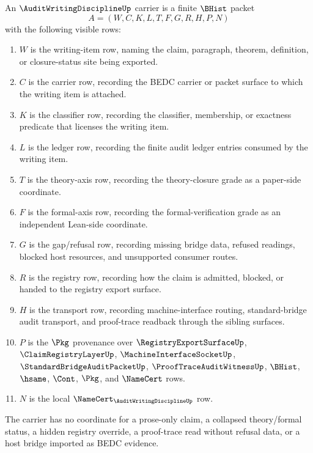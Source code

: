 \begin{definition}
\label{def:audit-writing-discipline-carrier}
An $\AuditWritingDisciplineUp$ carrier is a finite $\BHist$ packet
$$
A=(W,C,K,L,T,F,G,R,H,P,N)
$$
with the following visible rows:
\begin{enumerate}
\item $W$ is the writing-item row, naming the claim, paragraph, theorem, definition, or closure-status site being exported.
\item $C$ is the carrier row, recording the BEDC carrier or packet surface to which the writing item is attached.
\item $K$ is the classifier row, recording the classifier, membership, or exactness predicate that licenses the writing item.
\item $L$ is the ledger row, recording the finite audit ledger entries consumed by the writing item.
\item $T$ is the theory-axis row, recording the theory-closure grade as a paper-side coordinate.
\item $F$ is the formal-axis row, recording the formal-verification grade as an independent Lean-side coordinate.
\item $G$ is the gap/refusal row, recording missing bridge data, refused readings, blocked host resources, and unsupported consumer routes.
\item $R$ is the registry row, recording how the claim is admitted, blocked, or handed to the registry export surface.
\item $H$ is the transport row, recording machine-interface routing, standard-bridge audit transport, and proof-trace readback through the sibling surfaces.
\item $P$ is the $\Pkg$ provenance over $\RegistryExportSurfaceUp$, $\ClaimRegistryLayerUp$, $\MachineInterfaceSocketUp$, $\StandardBridgeAuditPacketUp$, $\ProofTraceAuditWitnessUp$, $\BHist$, $\hsame$, $\Cont$, $\Pkg$, and $\NameCert$ rows.
\item $N$ is the local $\NameCert_{\AuditWritingDisciplineUp}$ row.
\end{enumerate}
The carrier has no coordinate for a prose-only claim, a collapsed theory/formal status, a hidden registry override, a proof-trace read without refusal data, or a host bridge imported as BEDC evidence.
\end{definition}

